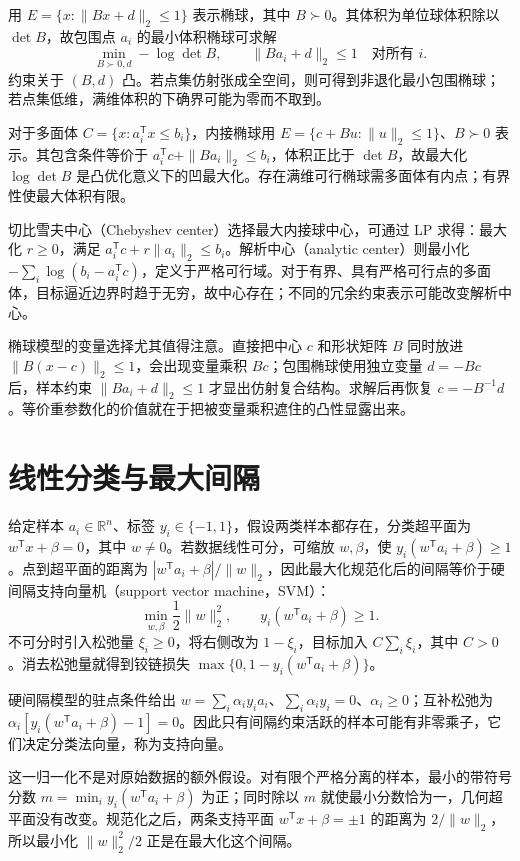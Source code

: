 用 $E=\{x:\|Bx+d\|_2\leq1\}$ 表示椭球，其中 $B\succ0$。其体积为单位球体积除以 $\det B$，故包围点 $a_i$ 的最小体积椭球可求解
\[
 \min_{B\succ0,d}-\log\det B,
 \qquad \|Ba_i+d\|_2\leq1\quad\text{对所有 }i.
\]
约束关于 $(B,d)$ 凸。若点集仿射张成全空间，则可得到非退化最小包围椭球；若点集低维，满维体积的下确界可能为零而不取到。

对于多面体 $C=\{x:a_i^{\mathsf T}x\leq b_i\}$，内接椭球用 $E=\{c+Bu:\|u\|_2\leq1\}$、$B\succ0$ 表示。其包含条件等价于 $a_i^{\mathsf T}c+\|Ba_i\|_2\leq b_i$，体积正比于 $\det B$，故最大化 $\log\det B$ 是凸优化意义下的凹最大化。存在满维可行椭球需多面体有内点；有界性使最大体积有限。

切比雪夫中心（Chebyshev center）选择最大内接球中心，可通过 LP 求得：最大化 $r\geq0$，满足 $a_i^{\mathsf T}c+r\|a_i\|_2\leq b_i$。解析中心（analytic center）则最小化 $-\sum_i\log(b_i-a_i^{\mathsf T}c)$，定义于严格可行域。对于有界、具有严格可行点的多面体，目标逼近边界时趋于无穷，故中心存在；不同的冗余约束表示可能改变解析中心。

椭球模型的变量选择尤其值得注意。直接把中心 $c$ 和形状矩阵 $B$ 同时放进 $\|B(x-c)\|_2\leq1$，会出现变量乘积 $Bc$；包围椭球使用独立变量 $d=-Bc$ 后，样本约束 $\|Ba_i+d\|_2\leq1$ 才显出仿射复合结构。求解后再恢复 $c=-B^{-1}d$。等价重参数化的价值就在于把被变量乘积遮住的凸性显露出来。

\section{线性分类与最大间隔}

给定样本 $a_i\in\mathbb R^n$、标签 $y_i\in\{-1,1\}$，假设两类样本都存在，分类超平面为 $w^{\mathsf T}x+\beta=0$，其中 $w\ne0$。若数据线性可分，可缩放 $w,\beta$，使 $y_i(w^{\mathsf T}a_i+\beta)\geq1$。点到超平面的距离为 $|w^{\mathsf T}a_i+\beta|/\|w\|_2$，因此最大化规范化后的间隔等价于硬间隔支持向量机（support vector machine，SVM）：
\[
 \min_{w,\beta}\frac12\|w\|_2^2,
 \qquad y_i(w^{\mathsf T}a_i+\beta)\geq1.
\]
不可分时引入松弛量 $\xi_i\geq0$，将右侧改为 $1-\xi_i$，目标加入 $C\sum_i\xi_i$，其中 $C>0$。消去松弛量就得到铰链损失 $\max\{0,1-y_i(w^{\mathsf T}a_i+\beta)\}$。

硬间隔模型的驻点条件给出 $w=\sum_i\alpha_i y_i a_i$、$\sum_i\alpha_i y_i=0$、$\alpha_i\geq0$；互补松弛为 $\alpha_i[y_i(w^{\mathsf T}a_i+\beta)-1]=0$。因此只有间隔约束活跃的样本可能有非零乘子，它们决定分类法向量，称为支持向量。

这一归一化不是对原始数据的额外假设。对有限个严格分离的样本，最小的带符号分数 $m=\min_i y_i(w^{\mathsf T}a_i+\beta)$ 为正；同时除以 $m$ 就使最小分数恰为一，几何超平面没有改变。规范化之后，两条支持平面 $w^{\mathsf T}x+\beta=\pm1$ 的距离为 $2/\|w\|_2$，所以最小化 $\|w\|_2^2/2$ 正是在最大化这个间隔。

